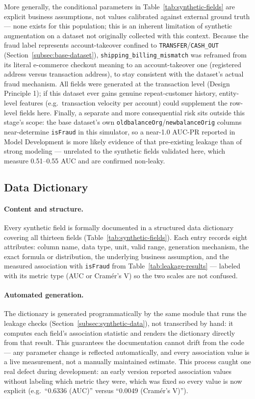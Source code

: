 More generally, the conditional parameters in Table~\ref{tab:synthetic-fields} are explicit business assumptions, not values calibrated against external ground truth --- none exists for this population; this is an inherent limitation of synthetic augmentation on a dataset not originally collected with this context. Because the fraud label represents account-takeover confined to \texttt{TRANSFER}/\texttt{CASH\_OUT} (Section~\ref{subsec:base-dataset}), \texttt{shipping\_billing\_mismatch} was reframed from its literal e-commerce checkout meaning to an account-takeover one (registered address versus transaction address), to stay consistent with the dataset's actual fraud mechanism. All fields were generated at the transaction level (Design Principle 1); if this dataset ever gains genuine repeat-customer history, entity-level features (e.g.\ transaction velocity per account) could supplement the row-level fields here. Finally, a separate and more consequential risk sits outside this stage's scope: the base dataset's own \texttt{oldbalanceOrg}/\texttt{newbalanceOrig} columns near-determine \texttt{isFraud} in this simulator, so a near-1.0 AUC-PR reported in Model Development is more likely evidence of that pre-existing leakage than of strong modeling --- unrelated to the synthetic fields validated here, which measure 0.51--0.55 AUC and are confirmed non-leaky.

\subsection{Data Dictionary}
\label{subsec:data-dictionary}

\paragraph{Content and structure.} Every synthetic field is formally documented in a structured data dictionary covering all thirteen fields (Table~\ref{tab:synthetic-fields}). Each entry records eight attributes: column name, data type, unit, valid range, generation mechanism, the exact formula or distribution, the underlying business assumption, and the measured association with \texttt{isFraud} from Table~\ref{tab:leakage-results} --- labeled with its metric type (AUC or Cram\'er's V) so the two scales are not confused.

\paragraph{Automated generation.} The dictionary is generated programmatically by the same module that runs the leakage checks (Section~\ref{subsec:synthetic-data}), not transcribed by hand: it computes each field's association statistic and renders the dictionary directly from that result. This guarantees the documentation cannot drift from the code --- any parameter change is reflected automatically, and every association value is a live measurement, not a manually maintained estimate. This process caught one real defect during development: an early version reported association values without labeling which metric they were, which was fixed so every value is now explicit (e.g.\ ``0.6336 (AUC)'' versus ``0.0049 (Cram\'er's V)'').

